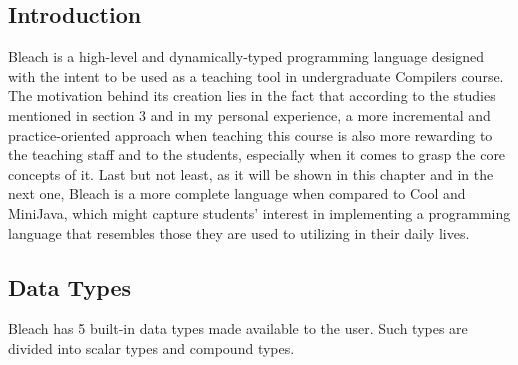 \subsection{Introduction}
Bleach is a high-level and dynamically-typed programming language designed with the intent to be used as a teaching tool in undergraduate Compilers course. The motivation behind its creation lies in the fact that according to the studies mentioned in section 3 and in my personal experience, a more incremental and practice-oriented approach when teaching this course is also more rewarding to the teaching staff and to the students, especially when it comes to grasp the core concepts of it. Last but not least, as it will be shown in this chapter and in the next one, Bleach is a more complete language when compared to Cool and MiniJava, which might capture students' interest in implementing a programming language that resembles those they are used to utilizing in their daily lives.

\subsection{Data Types}
Bleach has 5 built-in data types made available to the user. Such types are divided into scalar types  and compound types.


